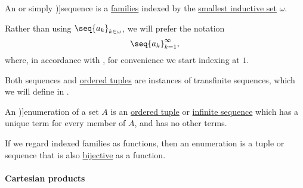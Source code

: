 \begin{definition}\label{def:sequence}
  An  or simply \term[ru=последовательность (\cite[10]{Архангельский1988КанторовскаяТеорияМножеств})]{sequence} is a \hyperref[def:indexed_family]{families} indexed by the \hyperref[thm:smallest_inductive_set_existence]{smallest inductive set} \( \omega \).

  Rather than using \( \seq{ a_k }_{k \in \omega} \), we will prefer the notation
  \begin{equation*}
    \seq{ a_k }_{k=1}^\infty,
  \end{equation*}
  where, in accordance with , for convenience we start indexing at \( 1 \).
\end{definition}
\begin{comments}
  \item Both sequences and \hyperref[def:ordered_tuple]{ordered tuples} are instances of transfinite sequences, which we will define in .
\end{comments}

\begin{definition}\label{def:enumeration}\mimprovised
  An \term[en=enumeration (\cite[190]{Kleene2002Logic})]{enumeration} of a set \( A \) is an \hyperref[def:ordered_tuple]{ordered tuple} or \hyperref[def:sequence]{infinite sequence} which has a unique term for every member of \( A \), and has no other terms.
\end{definition}
\begin{comments}
  \item If we regard indexed families as functions, then an enumeration is a tuple or sequence that is also \hyperref[def:function_invertibility/bijective]{bijective} as a function.
\end{comments}

\paragraph{Cartesian products}

